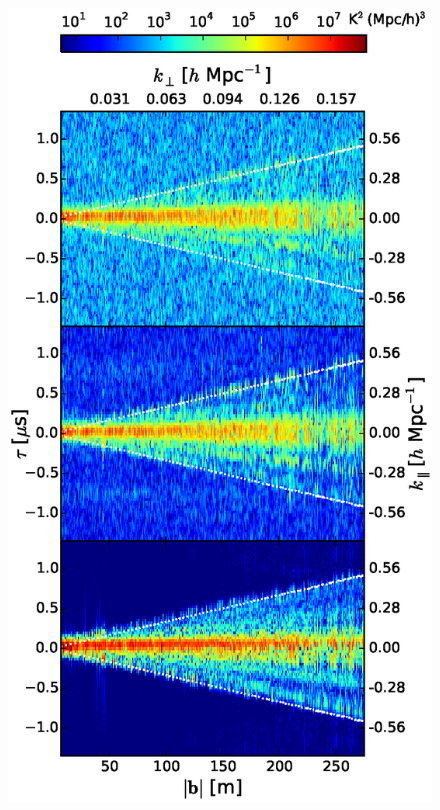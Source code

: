 \documentclass[preprint2,apjl,numberedappendix,twocolappendix,appendixfloats]{emulateapj}
\begin{document}
\begin{figure}[htb]
\centering
\includegraphics[width=\linewidth]{multi_baseline_fhd_sim_visibilities_amplitudes_comparison_185.0_MHz_30.7_MHz.eps}

\end{figure}
\end{document}
